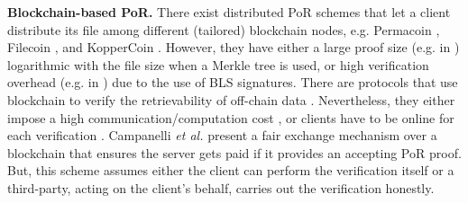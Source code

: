 


\noindent\textbf{Blockchain-based PoR.} There exist distributed PoR schemes that let a client  distribute its file among different (tailored) blockchain nodes,  e.g. Permacoin \cite{MillerPermacoin}, Filecoin  \cite{Filecoin}, and KopperCoin \cite{KoppBK16}. However,  they have either a large proof size (e.g. in \cite{MillerPermacoin,Filecoin})  logarithmic with the  file size when a  Merkle tree is used, or high verification overhead (e.g. in \cite{KoppBK16}) due to the use of BLS signatures. There are protocols that use blockchain to verify the retrievability of off-chain data \cite{RennerMK18,HaoXWJW18,ZhangDLZ18,Audita18,blockchain-data-audit-18,sia14}. Nevertheless, they either impose a high communication/computation cost \cite{RennerMK18,HaoXWJW18,Audita18,blockchain-data-audit-18,sia14}, or  clients have to be online for each verification  \cite{ZhangDLZ18}.  Campanelli \textit{et al.}  \cite{CampanelliGGN17}  present a fair exchange mechanism over a blockchain that ensures the server gets paid if it provides an accepting PoR proof. But, this scheme assumes either the client can   perform the verification itself or a third-party, acting on the client's behalf,  carries out the verification honestly. 








